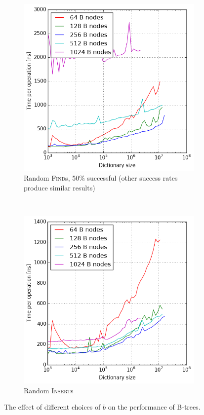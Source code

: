 \begin{figure}
\centering
\begin{subfigure}[t]{0.45\textwidth}
	\includegraphics[width=\textwidth]{img/btree-b-find-50}
	\caption{Random \textsc{Find}s, 50\% successful (other success rates
		produce similar results)}
\end{subfigure}
~
\begin{subfigure}[t]{0.45\textwidth}
	\includegraphics[width=\textwidth]{img/btree-b-insert}
	\caption{Random \textsc{Insert}s}
\end{subfigure}
\caption{The effect of different choices of $b$ on the performance of B-trees.}
\label{fig:btree-b-perf}
\end{figure}

